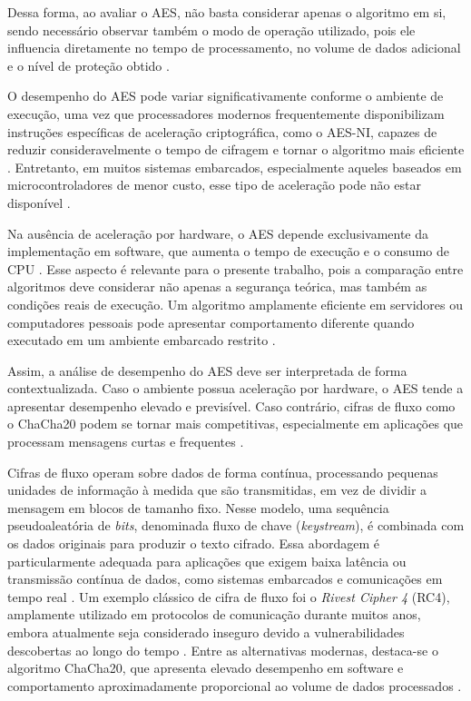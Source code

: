 Dessa forma, ao avaliar o AES, não basta considerar apenas o algoritmo em si, sendo necessário observar também o modo de operação utilizado, pois ele influencia diretamente no tempo de processamento, no volume de dados adicional e o nível de proteção obtido \cite{fazzat2020comparative}.

O desempenho do AES pode variar significativamente conforme o ambiente de execução, uma vez que processadores modernos frequentemente disponibilizam instruções específicas de aceleração criptográfica, como o AES-NI, capazes de reduzir consideravelmente o tempo de cifragem e tornar o algoritmo mais eficiente \cite{gueron2010intel}. Entretanto, em muitos sistemas embarcados, especialmente aqueles baseados em microcontroladores de menor custo, esse tipo de aceleração pode não estar disponível \cite{eisenbarth2007survey}.

Na ausência de aceleração por hardware, o AES depende exclusivamente da implementação em software, que aumenta o tempo de execução e o consumo de CPU \cite{aziz2007memory}. Esse aspecto é relevante para o presente trabalho, pois a comparação entre algoritmos deve considerar não apenas a segurança teórica, mas também as condições reais de execução. Um algoritmo amplamente eficiente em servidores ou computadores pessoais pode apresentar comportamento diferente quando executado em um ambiente embarcado restrito \cite{beaulieu2015simon}.

Assim, a análise de desempenho do AES deve ser interpretada de forma contextualizada. Caso o ambiente possua aceleração por hardware, o AES tende a apresentar desempenho elevado e previsível. Caso contrário, cifras de fluxo como o ChaCha20 podem se tornar mais competitivas, especialmente em aplicações que processam mensagens curtas e frequentes \cite{nir2018chacha20}.

Cifras de fluxo operam sobre dados de forma contínua, processando pequenas unidades de informação à medida que são transmitidas, em vez de dividir a mensagem em blocos de tamanho fixo. Nesse modelo, uma sequência pseudoaleatória de \textit{bits}, denominada fluxo de chave (\textit{keystream}), é combinada com os dados originais para produzir o texto cifrado. Essa abordagem é particularmente adequada para aplicações que exigem baixa latência ou transmissão contínua de dados, como sistemas embarcados e comunicações em tempo real \cite{menezes2018handbook}. Um exemplo clássico de cifra de fluxo foi o \textit{Rivest Cipher 4} (RC4), amplamente utilizado em protocolos de comunicação durante muitos anos, embora atualmente seja considerado inseguro devido a vulnerabilidades descobertas ao longo do tempo \cite{alfardan2013security}. Entre as alternativas modernas, destaca-se o algoritmo ChaCha20, que apresenta elevado desempenho em software e comportamento aproximadamente proporcional ao volume de dados processados \cite{bernstein2008chacha,manifavas2016survey}.

